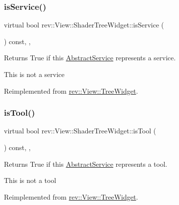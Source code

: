 \subsubsection{\texorpdfstring{isService()}{isService()}}
{\footnotesize\ttfamily virtual bool rev\+::\+View\+::\+Shader\+Tree\+Widget\+::is\+Service (\begin{DoxyParamCaption}{ }\end{DoxyParamCaption}) const\hspace{0.3cm}{\ttfamily [inline]}, {\ttfamily [override]}, {\ttfamily [virtual]}}



Returns True if this \mbox{\hyperlink{classrev_1_1_abstract_service}{Abstract\+Service}} represents a service. 

This is not a service 

Reimplemented from \mbox{\hyperlink{classrev_1_1_view_1_1_tree_widget_a9f10e939850acf8fce1992b5b9b3fc24}{rev\+::\+View\+::\+Tree\+Widget}}.

\mbox{\label{classrev_1_1_view_1_1_shader_tree_widget_a18ff9900b7ddc8a7728443b42020be72}} 
\subsubsection{\texorpdfstring{isTool()}{isTool()}}
{\footnotesize\ttfamily virtual bool rev\+::\+View\+::\+Shader\+Tree\+Widget\+::is\+Tool (\begin{DoxyParamCaption}{ }\end{DoxyParamCaption}) const\hspace{0.3cm}{\ttfamily [inline]}, {\ttfamily [override]}, {\ttfamily [virtual]}}



Returns True if this \mbox{\hyperlink{classrev_1_1_abstract_service}{Abstract\+Service}} represents a tool. 

This is not a tool 

Reimplemented from \mbox{\hyperlink{classrev_1_1_view_1_1_tree_widget_a7ff55c9e8c83c70e9331a7fe7acafbb6}{rev\+::\+View\+::\+Tree\+Widget}}.

\mbox{\label{classrev_1_1_view_1_1_shader_tree_widget_a34120d5ac0a72d1bc042f1933d11e984}} 
